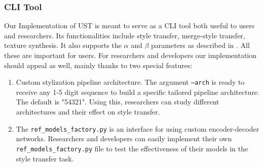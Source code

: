 \subsubsection{CLI Tool}
Our Implementation of UST is meant to serve as a CLI tool both useful to users and researchers. Its functionalities include style transfer, merge-style transfer, texture synthesis. It also supports the $\alpha$ and $\beta$ parameters as described in \cite{bib11}. All these are important for users. For researchers and developers our implementation should appeal as well, mainly thanks to two special features:
\begin{enumerate}
	\item Custom stylization pipeline architecture. The argument \texttt{--arch} is ready to receive any 1-5 digit sequence to build a specific tailored pipeline architecture. The default is "54321". Using this, researchers can study different architectures and their effect on style transfer.
	\item The \texttt{ref\_models\_factory.py} is an interface for using custom encoder-decoder networks. Researchers and developers can easily implement their own \texttt{ref\_models\_factory.py} file to test the effectiveness of their models in the style transfer task.
\end{enumerate} 